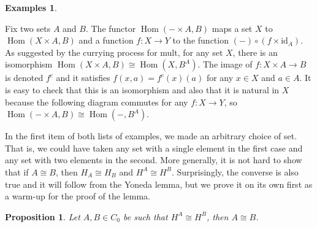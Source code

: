 \documentclass{article}
\newtheorem{prop}[thm]{Proposition}
\theoremstyle{definition}
\newtheorem{exmps}[thm]{Examples}
\theoremstyle{remark}
\DeclareMathOperator{\Hom}{Hom}
\newcommand{\id}{\text{id}}
\begin{document}
\begin{exmps}
\begin{enumerate}
		Fix two sets $A$ and $B$. The functor $\Hom(-\times A,B)$ maps a set $X$ to $\Hom(X\times A, B)$ and a function $f:X\rightarrow Y$ to the function $(-) \circ (f \times \id_A)$. As suggested by the currying process for \textsf{mult}, for any set $X$, there is an isomorphism $\Hom(X\times A,B) \cong \Hom(X, B^A)$. The image of $f:X\times A \rightarrow B$ is denoted $f^c$ and it satisfies $f(x,a) = f^c(x)(a)$ for any $x \in X$ and $a \in A$. It is easy to check that this is an isomorphism and also that it is natural in $X$ because the following diagram commutes for any $f:X\rightarrow Y$, so $\Hom(-\times A,B) \cong \Hom(-,B^A)$.
		\begin{figure}[h]
			\centering
		\end{figure}
	\end{enumerate}
\end{exmps}
In the first item of both lists of examples, we made an arbitrary choice of set. That is, we could have taken any set with a single element in the first case and any set with two elements in the second. More generally, it is not hard to show that if $A \cong B$, then $H_A \cong H_B$ and $H^A \cong H^B$. Surprisingly, the converse is also true and it will follow from the Yoneda lemma, but we prove it on its own first as a warm-up for the proof of the lemma.
\begin{prop}
	Let $A,B \in C_0$ be such that $H^A \cong H^B$, then $A \cong B$.
\end{prop}
\end{document}
